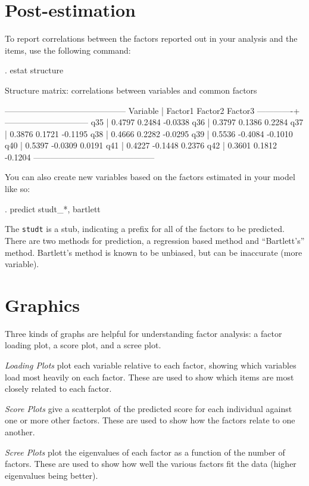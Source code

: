 \documentclass[12pt]{article}
\begin{document}
\section{Post-estimation}

To report correlations between the factors reported out in your
analysis and the items, use the following command:


\begin{stlog}
  

. estat structure

Structure matrix: correlations between variables and common factors

    --------------------------------------------
        Variable |  Factor1   Factor2   Factor3 
    -------------+------------------------------
             q35 |   0.4797    0.2484   -0.0338 
             q36 |   0.3797    0.1386    0.2284 
             q37 |   0.3876    0.1721   -0.1195 
             q38 |   0.4666    0.2282   -0.0295 
             q39 |   0.5536   -0.4084   -0.1010 
             q40 |   0.5397   -0.0309    0.0191 
             q41 |   0.4227   -0.1448    0.2376 
             q42 |   0.3601    0.1812   -0.1204 
    --------------------------------------------


\end{stlog}


You can also create new variables based on the factors estimated in
your model like so:

\begin{stlog}
  . predict studt_*, bartlett
\end{stlog}

The \texttt{studt} is a stub, indicating a prefix for all of the
factors to be predicted. There are two methods for prediction, a
regression based method and ``Bartlett's'' method. Bartlett's method
is known to be unbiased, but can be inaccurate (more variable).


\section{Graphics}

Three kinds of graphs are helpful for understanding factor analysis: a
factor loading plot, a score plot, and a scree plot. 

\begin{description}
\item \emph{Loading Plots} plot each variable relative to each factor,
  showing which variables load most heavily on each factor. These are
  used to show which items are most closely related to each factor. 


\item \emph{Score Plots} give a scatterplot of the predicted score for
  each individual against one or more other factors. These are used to
  show how the factors relate to one another.


\item \emph{Scree Plots} plot the eigenvalues of each factor as a
  function of the number of factors. These are used to show how well
  the various factors fit the data (higher eigenvalues being better). 
\end{description}
\end{document}
